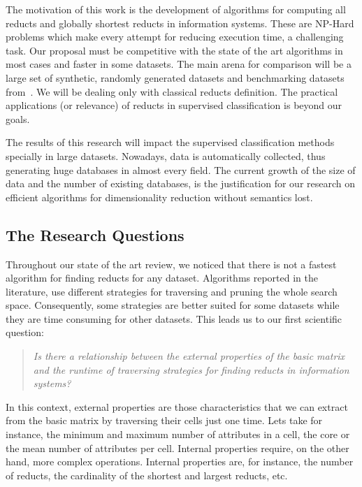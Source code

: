 \documentclass[authoryear,11pt]{elsarticle}
\begin{document}
  The motivation of this work is the development of algorithms for computing all reducts and 
  globally shortest reducts in information systems. These are NP-Hard problems which make every attempt 
  for reducing execution time, a challenging task. Our proposal must be competitive with the state of 
  the art algorithms in most cases and faster in some datasets. The main arena for comparison will be a 
  large set of synthetic, randomly generated datasets and benchmarking datasets from~\citep{Bache13}. 
  We will be dealing only with classical reducts definition. The practical applications (or relevance) of 
  reducts in supervised classification is beyond our goals.
  
  The results of this research will impact the supervised classification methods specially in large datasets.
  Nowadays, data is automatically collected, thus generating huge databases in almost every field. The 
  current growth of the size of data and the number of existing databases, is the justification for our
  research on efficient algorithms for dimensionality reduction without semantics lost.  
  
\subsection{The Research Questions}\label{ResearchQuestions} 
  Throughout our state of the art review, we noticed that there is not a fastest algorithm for finding reducts 
  for any dataset. Algorithms reported in the literature, use different strategies for traversing and pruning 
  the whole search space. Consequently, some strategies are better suited for some datasets while they are time
  consuming for other datasets.
  This leads us to our first scientific question:
  
\begin{quote}
  \emph{Is there a relationship between the external properties of the basic matrix and the runtime 
  		of traversing strategies for finding reducts in information systems?}
\end{quote}
  		
  In this context, external properties are those characteristics that we can extract from the basic
  matrix by traversing their cells just one time. Lets take for instance, the minimum and maximum number of
  attributes in a cell, the core or the mean number of attributes per cell. Internal properties require, on 
  the other hand, more complex operations. Internal properties are, for instance, the number of reducts, the
  cardinality of the shortest and largest reducts, etc.
  
\end{document}

